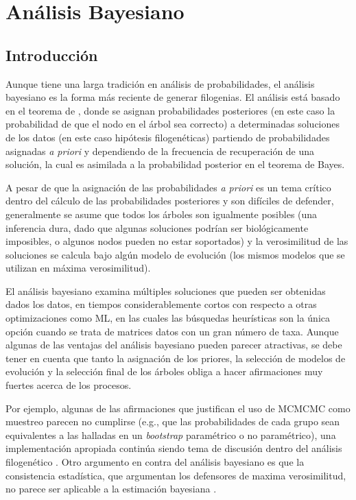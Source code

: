 \chapter{An\'alisis Bayesiano}
\section*{Introducci\'on}
Aunque tiene una larga tradici\'on en an\'alisis de probabilidades, el an\'alisis bayesiano es la forma m\'as reciente de generar filogenias.  El an\'alisis est\'a basado en el teorema de \cite{Bayes1763}, donde se asignan probabilidades posteriores (en este caso la probabilidad de que el nodo en el \'arbol sea correcto) a determinadas soluciones de los datos (en este caso hip\'otesis filogen\'eticas) partiendo de probabilidades asignadas \textit{a priori} y dependiendo de la frecuencia de recuperaci\'on de una soluci\'on, la cual es asimilada a la probabilidad posterior en el teorema de Bayes.

A pesar de que la asignaci\'on de las probabilidades  \textit{a priori} es un tema cr\'itico dentro del c\'alculo de las probabilidades posteriores y son dif\'iciles de defender, generalmente se asume que todos los \'arboles son igualmente posibles (una inferencia dura, dado que algunas soluciones 
podr\'ian ser biol\'ogicamente imposibles, o algunos nodos pueden no estar soportados) y la verosimilitud de las soluciones se calcula bajo alg\'un modelo de evoluci\'on (los mismos modelos que se utilizan en m\'axima verosimilitud)\citep{HuelsenbeckRonquist2001}.

El an\'alisis bayesiano examina m\'ultiples soluciones que pueden ser obtenidas dados los datos, en tiempos considerablemente cortos con respecto a otras optimizaciones como ML, en las cuales las b\'usquedas heur\'isticas son la \'unica opci\'on cuando se trata de matrices datos con un gran n\'umero de taxa. Aunque algunas de las ventajas del an\'alisis bayesiano pueden parecer atractivas, se debe tener en cuenta que tanto la asignaci\'on de los priores, la selecci\'on de modelos de evoluci\'on y la selecci\'on final de los \'arboles obliga a hacer afirmaciones muy fuertes acerca de los procesos. 

Por ejemplo, algunas de las afirmaciones que justifican el uso de MCMCMC como muestreo parecen no cumplirse (e.g., que las probabilidades de cada grupo sean equivalentes a las halladas en un \textit{bootstrap} param\'etrico o no param\'etrico), una implementaci\'on apropiada contin\'ua siendo tema de discusi\'on dentro del an\'alisis filogen\'etico \citep{Alfaro2003,Alfaro2006}. Otro argumento en contra del an\'alisis bayesiano es que la consistencia estad\'istica, que argumentan los defensores de maxima verosimilitud, no parece ser aplicable a la estimaci\'on bayesiana \cite{Goloboff2005}.


